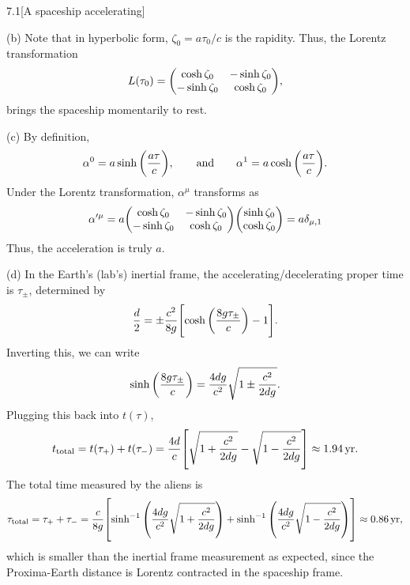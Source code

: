 \documentclass[12pt]{article}
\begin{document}
\begin{problem}{7.1}[A spaceship accelerating]
\begin{solution}
(b) Note that in hyperbolic form, $\zeta_0=a\tau_0/c$ is the rapidity. Thus, the
Lorentz transformation
\begin{equation}
    L(\tau_0)=\mqty(\cosh\zeta_0&-\sinh\zeta_0\\-\sinh\zeta_0&\cosh\zeta_0), 
\end{equation}
brings the spaceship momentarily to rest.

(c) By definition,
\begin{equation}
    \alpha^0=a\sinh\qty(\frac{a\tau}{c}),\qquad\t{and}\qquad
    \alpha^1=a\cosh\qty(\frac{a\tau}{c}).
\end{equation}
Under the Lorentz transformation, $\alpha^\mu$ transforms as
\begin{equation}
    \alpha'^\mu
    =a\mqty(\cosh\zeta_0&-\sinh\zeta_0\\-\sinh\zeta_0&\cosh\zeta_0)
    \mqty(\sinh\zeta_0\\\cosh\zeta_0)
    =a\delta_{\mu,1}
\end{equation}
Thus, the acceleration is truly $a$.

(d) In the Earth's (lab's) inertial frame, the accelerating/decelerating
proper time is $\tau_\pm$, determined by
\begin{equation}
    \frac{d}{2}=\pm\frac{c^2}{8g}\qty[\cosh\qty(\frac{8g\tau_\pm}{c})-1].
\end{equation}
Inverting this, we can write
\begin{equation}
    \sinh\qty(\frac{8g\tau_\pm}{c}) 
    =\frac{4dg}{c^2}\sqrt{1\pm\frac{c^2}{2dg}}.
\end{equation}
Plugging this back into $t(\tau)$,
\begin{equation}
    t_\t{total}=t(\tau_+)+t(\tau_-)
    =\frac{4d}{c}\qty[\sqrt{1+\frac{c^2}{2dg}}-\sqrt{1-\frac{c^2}{2dg}}]
    \approx 1.94\,\si{yr}.
\end{equation}
The total time measured by the aliens is
\begin{equation}
    \tau_\t{total}=\tau_++\tau_-
    =\frac{c}{8g}\qty[\sinh^{-1}\qty(\frac{4dg}{c^2}\sqrt{1+\frac{c^2}{2dg}})
    +\sinh^{-1}\qty(\frac{4dg}{c^2}\sqrt{1-\frac{c^2}{2dg}})]
    \approx0.86\,\si{yr},
\end{equation}
which is smaller than the inertial frame measurement as expected, since the
Proxima-Earth distance is Lorentz contracted in the spaceship frame.
\end{solution}
\end{problem}
\newpage
\end{document}
